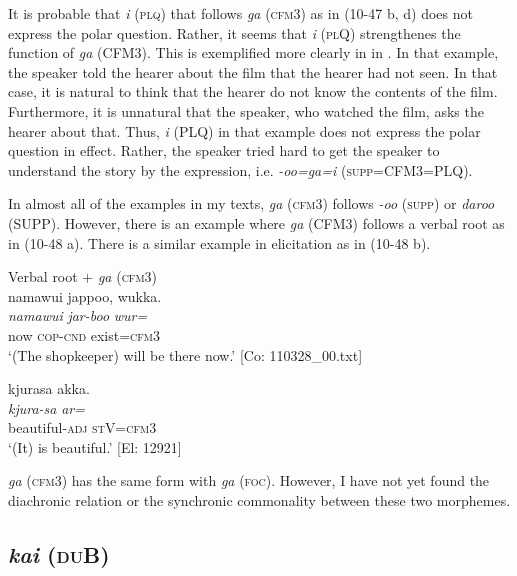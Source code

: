 It is probable that \textit{i} (\textsc{plq}) that follows \textit{ga} (\textsc{cfm}3) as in (10-47 b, d) does not express the polar question. Rather, it seems that \textit{i} (\textsc{pl}Q) strengthenes the function of \textit{ga} (CFM3). This is exemplified more clearly in  in . In that example, the speaker told the hearer about the film that the hearer had not seen. In that case, it is natural to think that the hearer do not know the contents of the film. Furthermore, it is unnatural that the speaker, who watched the film, asks the hearer about that. Thus, \textit{i} (PLQ) in that example does not express the polar question in effect. Rather, the speaker tried hard to get the speaker to understand the story by the expression, i.e. \textit{{}-oo=ga=i} (\textsc{supp}=CFM3=PLQ).

In almost all of the examples in my texts, \textit{ga} (\textsc{cfm}3) follows \textit{-oo} (\textsc{supp}) or \textit{daroo} (SUPP). However, there is an example where \textit{ga} (CFM3) follows a verbal root as in (10-48 a). There is a similar example in elicitation as in (10-48 b).

\ea\label{ex:10.48}   Verbal root + \textit{ga} (\textsc{cfm}3)\\
  \ea  %
      \glll    namawui  jappoo,  wukka.\\
      \textit{namawui}  \textit{jar-boo}  \textit{wur=}\\
      now  \textsc{cop}-\textsc{cnd}  exist=\textsc{cfm}3\\
      \glt       ‘(The shopkeeper) will be there now.’ [Co: 110328\_00.txt]

  \ex  %
      \glll    kjurasa  akka.\\
      \textit{kjura-sa}  \textit{ar=}\\
      beautiful-\textsc{adj}  \textsc{st}V=\textsc{cfm}3\\
      \glt       ‘(It) is beautiful.’ [El: 12921]
    \z
\z

  \textit{ga} (\textsc{cfm}3) has the same form with \textit{ga} (\textsc{foc}). However, I have not yet found the diachronic relation or the synchronic commonality between these two morphemes.

\subsection{\textit{kai} (\textsc{du}B)}\label{sec:10.3.6}

